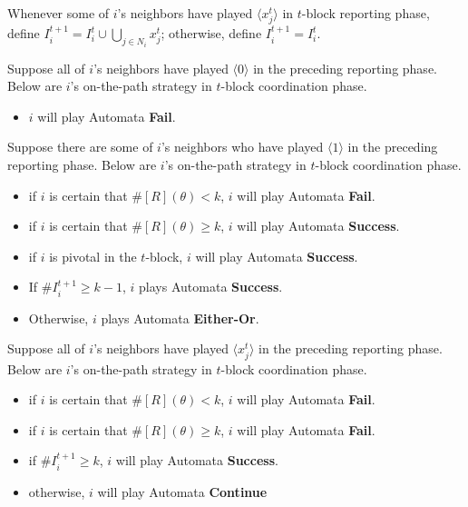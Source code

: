 \documentclass[12pt,letter]{article}
\theoremstyle{definition}
\theoremstyle{definition}
\theoremstyle{remark}
\theoremstyle{claim}
\begin{document}
Whenever some of $i$'s neighbors have played $\langle x^t_j \rangle$ in $t$-block reporting phase, define $I^{t+1}_i=I^t_i\cup \bigcup_{j\in N_i} x^t_j$; otherwise, define  $I^{t+1}_i=I^t_i$.

Suppose all of $i$'s neighbors have played $\langle 0 \rangle$ in the preceding reporting phase. Below are $i$'s on-the-path strategy in $t$-block coordination phase.
\begin{itemize}
\item $i$ will play Automata \textbf{Fail}.
\end{itemize}

Suppose there are some of $i$'s neighbors who have played $\langle 1 \rangle$ in the preceding reporting phase. Below are $i$'s on-the-path strategy in $t$-block coordination phase.
\begin{itemize}
\item if $i$ is certain that $\#[R](\theta)<k$, $i$ will play Automata \textbf{Fail}.
\item if $i$ is certain that $\#[R](\theta)\geq k$, $i$ will play Automata \textbf{Success}.
\item if $i$ is pivotal in the $t$-block, $i$ will play Automata \textbf{Success}.
\item If $\#I^{t+1}_i\geq k-1$, $i$ plays Automata \textbf{Success}.
\item Otherwise, $i$ plays Automata \textbf{Either-Or}.
\end{itemize}

Suppose all of $i$'s neighbors have played $\langle x^t_j \rangle$ in the preceding reporting phase. Below are $i$'s on-the-path strategy in $t$-block coordination phase.
\begin{itemize}
\item if $i$ is certain that $\#[R](\theta)<k$, $i$ will play Automata \textbf{Fail}.
\item if $i$ is certain that $\#[R](\theta)\geq k$, $i$ will play Automata \textbf{Fail}.
\item if $\# I^{t+1}_i\geq k$, $i$ will play Automata \textbf{Success}.
\item otherwise, $i$ will play Automata \textbf{Continue}
\end{itemize}
\end{document}
